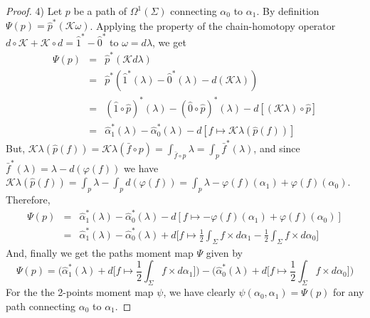 \documentclass[10pt,reqno,twoside]{amsart}
\newcommand{\cK}{\mathcal{K}}
\newcommand{\undemi}{\frac{1}{2}}
\newcommand{\but}{\hat{1}}
\newcommand{\source}{\hat{0}}
\theoremstyle{plain}
\theoremstyle{definition}
\begin{document}
\begin{proof}
    4) Let $p$ be a path of $\Omega^1(\Sigma)$ connecting $\alpha_0$ to $\alpha_1$.
    By definition $\Psi(p) = \hat p^*(\cK\omega)$.
    Applying the property of the chain-homotopy operator $d \circ \cK + \cK \circ d = \but^* - \source^*$ to $\omega = d\lambda$,
    we get
    \begin{eqnarray*}
      \Psi(p) & = & \hat p^*(\cK d\lambda) \\
      & = & \hat p^*(\but^*(\lambda) - \source^*(\lambda) - d (\cK \lambda)) \\
      & = & (\but \circ \hat p)^*(\lambda) - (\source \circ \hat p)^*(\lambda) - d [(\cK \lambda) \circ \hat p] \\
      & = & \hat \alpha_1^*(\lambda) - \hat \alpha_0^*(\lambda) - d[f \mapsto \cK\lambda(\hat p(f)) ]
    \end{eqnarray*}
    But,
    $\cK\lambda(\hat p(f)) = \cK\lambda(\bar f \circ p) = \int_{\bar f \circ p} \lambda = \int_p \bar f^*(\lambda)$,
    and since $\bar f^*(\lambda) = \lambda - d(\varphi(f))$ we have $\cK\lambda(\hat p(f)) = \int_p \lambda - \int_p d(\varphi(f)) = \int_p \lambda - \varphi(f)(\alpha_1) + \varphi(f)(\alpha_0)$.
    Therefore,
    \begin{eqnarray*}
      \Psi(p) & = & \hat \alpha_1^*(\lambda) - \hat \alpha_0^*(\lambda) - d[f \mapsto - \varphi(f)(\alpha_1) + \varphi(f)(\alpha_0)] \\
      & = & \hat \alpha_1^*(\lambda) - \hat \alpha_0^*(\lambda) + d\bigg[ f \mapsto \undemi \int_\Sigma f \times d\alpha_1 - \undemi \int_\Sigma f \times d \alpha_0 \bigg]
    \end{eqnarray*}
    And,
    finally we get the paths moment map $\Psi$ given by
    $$
      \Psi(p) = \bigg(\hat \alpha_1^*(\lambda) + d \bigg[f \mapsto \undemi \int_\Sigma f \times d\alpha_1 \bigg]\bigg) - \bigg(\hat \alpha_0^*(\lambda) + d \bigg[f \mapsto \undemi \int_\Sigma f \times d \alpha_0 \bigg]\bigg)
      $$
    For the the 2-points moment map $\psi$,
    we have clearly $ \psi(\alpha_0,\alpha_1) = \Psi(p)$ for any path connecting $\alpha_0$ to $\alpha_1$.
    

\end{proof}
\end{document}
